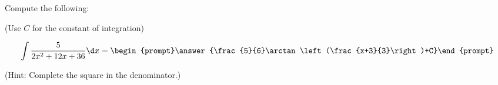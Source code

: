 \documentclass{ximera}
\author{Jim Talamo}
\begin{document}
\begin{exercise}
Compute the following:

\begin{prompt} (Use $C$ for the constant of integration) \end{prompt}

\[
\int \frac{5}{2x^2+12x+36} \d x =
\begin{prompt}\answer{\frac{5}{6}\arctan\left(\frac{x+3}{3}\right)+C}\end{prompt} \\
\]

\begin{prompt} (Hint: Complete the square in the denominator.) \end{prompt}
\end{exercise}
\end{document}
